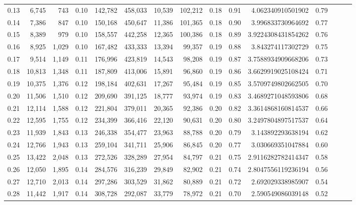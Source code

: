\begin{tabular}{rrrrrrrrrrrrrrr}
0.13 &   6,745 &    743 &  0.10 &  142,782 &  458,033 &   10,539 &  102,212 &  0.18 &  0.91 &     4.062340910501902 &      0.79 \\
0.14 &   7,386 &    847 &  0.10 &  150,168 &  450,647 &   11,386 &  101,365 &  0.18 &  0.90 &     3.996833730964692 &      0.77 \\
0.15 &   8,389 &    979 &  0.10 &  158,557 &  442,258 &   12,365 &  100,386 &  0.18 &  0.89 &    3.9224308431854262 &      0.76 \\
0.16 &   8,925 &  1,029 &  0.10 &  167,482 &  433,333 &   13,394 &   99,357 &  0.19 &  0.88 &     3.843274117302729 &      0.75 \\
0.17 &   9,514 &  1,149 &  0.11 &  176,996 &  423,819 &   14,543 &   98,208 &  0.19 &  0.87 &    3.7588934909668206 &      0.73 \\
0.18 &  10,813 &  1,348 &  0.11 &  187,809 &  413,006 &   15,891 &   96,860 &  0.19 &  0.86 &    3.6629919025108424 &      0.71 \\
0.19 &  10,375 &  1,376 &  0.12 &  198,184 &  402,631 &   17,267 &   95,484 &  0.19 &  0.85 &    3.5709749802662505 &      0.70 \\
0.20 &  11,506 &  1,510 &  0.12 &  209,690 &  391,125 &   18,777 &   93,974 &  0.19 &  0.83 &    3.4689271048593806 &      0.68 \\
0.21 &  12,114 &  1,588 &  0.12 &  221,804 &  379,011 &   20,365 &   92,386 &  0.20 &  0.82 &    3.3614868160814537 &      0.66 \\
0.22 &  12,595 &  1,755 &  0.12 &  234,399 &  366,416 &   22,120 &   90,631 &  0.20 &  0.80 &    3.2497804897517537 &      0.64 \\
0.23 &  11,939 &  1,843 &  0.13 &  246,338 &  354,477 &   23,963 &   88,788 &  0.20 &  0.79 &     3.143892293638194 &      0.62 \\
0.24 &  12,766 &  1,943 &  0.13 &  259,104 &  341,711 &   25,906 &   86,845 &  0.20 &  0.77 &     3.030669351047884 &      0.60 \\
0.25 &  13,422 &  2,048 &  0.13 &  272,526 &  328,289 &   27,954 &   84,797 &  0.21 &  0.75 &    2.9116282782414347 &      0.58 \\
0.26 &  12,050 &  1,895 &  0.14 &  284,576 &  316,239 &   29,849 &   82,902 &  0.21 &  0.74 &    2.8047556119236194 &      0.56 \\
0.27 &  12,710 &  2,013 &  0.14 &  297,286 &  303,529 &   31,862 &   80,889 &  0.21 &  0.72 &     2.692029338985907 &      0.54 \\
0.28 &  11,442 &  1,917 &  0.14 &  308,728 &  292,087 &   33,779 &   78,972 &  0.21 &  0.70 &     2.590549086039148 &      0.52 \\

\end{tabular}
